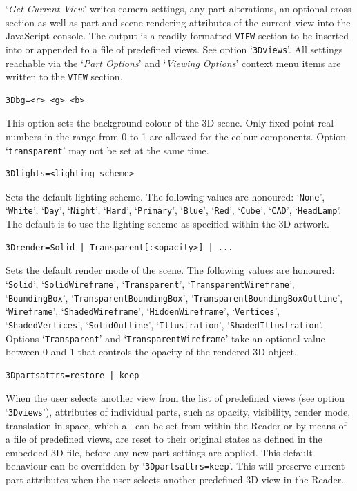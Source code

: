 \documentclass[a4paper]{article}
\begin{document}
`\emph{\sffamily Get Current View}' writes camera settings, any part alterations, an optional cross section as well as part and scene rendering attributes of the current view into the JavaScript console. The output is a readily formatted \verb+VIEW+ section to be inserted into or appended to a file of predefined views. See option `\verb+3Dviews+'. All settings reachable via the `\emph{\sffamily Part Options}' and `\emph{\sffamily Viewing Options}' context menu items are written to the \verb+VIEW+ section.
\begin{verbatim}
3Dbg=<r> <g> <b>
\end{verbatim}
This option sets the background colour of the 3D scene. Only fixed point real numbers in the range from 0 to 1 are allowed for the colour components. Option `\verb+transparent+' may not be set at the same time.
\begin{verbatim}
3Dlights=<lighting scheme>
\end{verbatim}
Sets the default lighting scheme. The following values are honoured: `\verb+None+', `\verb+White+', `\verb+Day+', `\verb+Night+', `\verb+Hard+', `\verb+Primary+', `\verb+Blue+', `\verb+Red+', `\verb+Cube+', `\verb+CAD+', `\verb+HeadLamp+'. The default is to use the lighting scheme as specified within the 3D artwork.
\begin{verbatim}
3Drender=Solid | Transparent[:<opacity>] | ...
\end{verbatim}
\begin{flushleft}
Sets the default render mode of the scene. The following values are honoured: `\verb+Solid+', `\verb+SolidWireframe+', `\verb+Transparent+', `\verb+TransparentWireframe+', `\verb+BoundingBox+', `\verb+TransparentBoundingBox+', `\verb+TransparentBoundingBoxOutline+', `\verb+Wireframe+', `\verb+ShadedWireframe+', `\verb+HiddenWireframe+', `\verb+Vertices+', `\verb+ShadedVertices+', `\verb+SolidOutline+', `\verb+Illustration+', `\verb+ShadedIllustration+'. Options `\verb+Transparent+' and `\verb+TransparentWireframe+' take an optional value between 0 and 1 that controls the opacity of the rendered 3D object.
\end{flushleft}
\begin{verbatim}
3Dpartsattrs=restore | keep
\end{verbatim}
When the user selects another view from the list of predefined views (see option `\verb+3Dviews+'), attributes of individual parts, such as opacity, visibility, render mode,
translation in space,
which all can be set from within the Reader or by means of a file of predefined views, are reset to their original states as defined in the embedded 3D file, before any new part settings are applied. This default behaviour can be overridden by `\verb+3Dpartsattrs=keep+'. This will preserve current part attributes when the user selects another predefined 3D view in the Reader.
\end{document}
